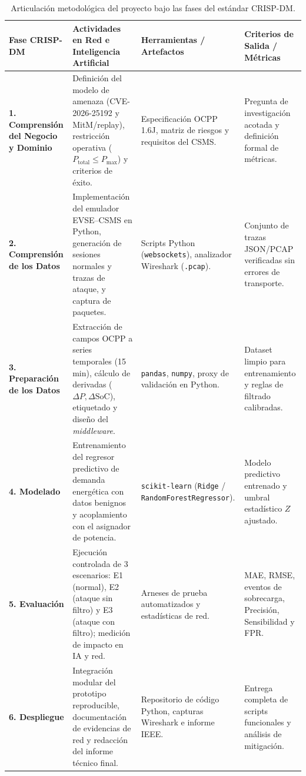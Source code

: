 \documentclass[conference]{IEEEtran}
\begin{document}
\begin{table}[t]
\centering
\caption{Articulación metodológica del proyecto bajo las fases del estándar CRISP-DM.}
\label{tab:crispdm}
\footnotesize
\setlength{\tabcolsep}{4pt}
\begin{tabularx}{\textwidth}{>{\raggedright\arraybackslash}p{2.7cm} >{\raggedright\arraybackslash}X >{\raggedright\arraybackslash}p{3.6cm} >{\raggedright\arraybackslash}p{3.9cm}}
\toprule
\textbf{Fase CRISP-DM} & \textbf{Actividades en Red e Inteligencia Artificial} & \textbf{Herramientas / Artefactos} & \textbf{Criterios de Salida / Métricas} \\
\midrule
\textbf{1. Comprensión del Negocio y Dominio} & Definición del modelo de amenaza (CVE-2026-25192 y MitM/replay), restricción operativa ($P_{\text{total}} \le P_{\max}$) y criterios de éxito. & Especificación OCPP 1.6J, matriz de riesgos y requisitos del CSMS. & Pregunta de investigación acotada y definición formal de métricas. \\
\addlinespace
\textbf{2. Comprensión de los Datos} & Implementación del emulador EVSE--CSMS en Python, generación de sesiones normales y trazas de ataque, y captura de paquetes. & Scripts Python (\texttt{websockets}), analizador Wireshark (\texttt{.pcap}). & Conjunto de trazas JSON/PCAP verificadas sin errores de transporte. \\
\addlinespace
\textbf{3. Preparación de los Datos} & Extracción de campos OCPP a series temporales (15 min), cálculo de derivadas ($\Delta P, \Delta \text{SoC}$), etiquetado y diseño del \textit{middleware}. & \texttt{pandas}, \texttt{numpy}, proxy de validación en Python. & Dataset limpio para entrenamiento y reglas de filtrado calibradas. \\
\addlinespace
\textbf{4. Modelado} & Entrenamiento del regresor predictivo de demanda energética con datos benignos y acoplamiento con el asignador de potencia. & \texttt{scikit-learn} (\texttt{Ridge} / \texttt{RandomForestRegressor}). & Modelo predictivo entrenado y umbral estadístico $Z$ ajustado. \\
\addlinespace
\textbf{5. Evaluación} & Ejecución controlada de 3 escenarios: E1 (normal), E2 (ataque sin filtro) y E3 (ataque con filtro); medición de impacto en IA y red. & Arneses de prueba automatizados y estadísticas de red. & MAE, RMSE, eventos de sobrecarga, Precisión, Sensibilidad y FPR. \\
\addlinespace
\textbf{6. Despliegue} & Integración modular del prototipo reproducible, documentación de evidencias de red y redacción del informe técnico final. & Repositorio de código Python, capturas Wireshark e informe IEEE. & Entrega completa de scripts funcionales y análisis de mitigación. \\
\bottomrule
\end{tabularx}
\end{table}
\FloatBarrier
\end{document}
